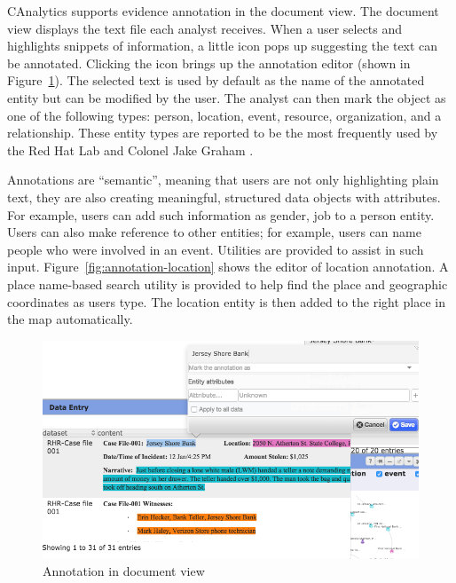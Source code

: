 CAnalytics supports evidence annotation in the document view. The
document view displays the text file each analyst receives. When a user selects and highlights snippets of information, a little icon pops up suggesting the text can be annotated. Clicking the icon brings up the annotation editor (shown in Figure~\ref{fig:annotation-editor}). The selected text is used by default as the name of the annotated entity but can be modified by the user. The analyst can then mark the object as one of the following types: person, location, event, resource, organization, and a relationship. These entity types are reported to be the most frequently used by the Red Hat Lab and Colonel Jake Graham . 

Annotations are ``semantic'', meaning
that users are not only highlighting plain text, they are also creating
meaningful, structured data objects with attributes. For example, users can add
such information as gender, job to a person entity. Users can also
make reference to other entities; for example, users can name people who were
involved in an event. Utilities are provided to assist in such input. Figure~\ref{fig:annotation-location} shows the editor of location annotation. A place name-based search utility is provided to help find the place and geographic coordinates as users type. The location entity is then added to the right place in the map automatically.

\begin{figure}
	\centering
	\includegraphics[width=\columnwidth]{03-System/img/annotation-1.png}
	\caption{Annotation in document view \label{fig:annotation-editor}}
\end{figure}

